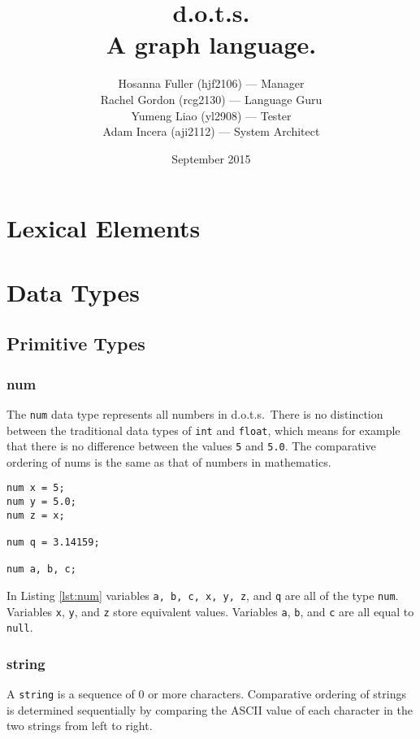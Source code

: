 \documentclass{article}
\title{d.o.t.s. \\ A graph language.}
\author{Hosanna Fuller (hjf2106) --- Manager\\
Rachel Gordon (rcg2130) --- Language Guru\\
Yumeng Liao (yl2908) --- Tester\\
Adam Incera (aji2112) --- System Architect}
\date{September 2015}
\newcommand{\pltlang}{d.o.t.s.} %
\newcommand{\code}[1]{\texttt{#1}} %
\begin{document}
\maketitle

\tableofcontents
\newpage

\section{Lexical Elements}

\section{Data Types}

\subsection{Primitive Types}

\subsubsection{num}

The \code{num} data type represents all numbers in \pltlang\ There is no distinction between the traditional data types of \code{int} and \code{float}, which means for example that there is no difference between the values \code{5} and \code{5.0}. The comparative ordering of nums is the same as that of numbers in mathematics. 

\begin{lstlisting}[language=pltLang, caption=Declaration of ``num'' types., label=lst:num]
num x = 5;
num y = 5.0;
num z = x;

num q = 3.14159;

num a, b, c;
\end{lstlisting}

In Listing \ref{lst:num} variables \code{a, b, c, x, y, z}, and \code{q} are all of the type \code{num}. Variables \code{x}, \code{y}, and \code{z} store equivalent values. Variables \code{a}, \code{b}, and \code{c} are all equal to \code{null}.

\subsubsection{string}

A \code{string} is a sequence of 0 or more characters. Comparative ordering of strings is determined sequentially by comparing the ASCII value of each character in the two strings from left to right.
\end{document}
